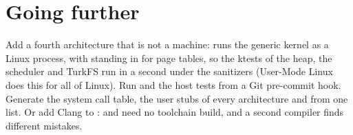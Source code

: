 \documentclass[11pt,a4paper]{article}
\begin{document}
\section{Going further}

Add a fourth architecture that is not a machine:  runs the generic kernel as a Linux process,
with  standing in for page tables, so the ktests of the heap, the scheduler and TurkFS run in a second under
the sanitizers (User-Mode Linux does this for all of Linux). Run  and the host tests from a
Git pre-commit hook. Generate the system call table, the user stubs of every architecture and 
from one list. Or add Clang to :  and
 need no toolchain build, and a second compiler finds different mistakes.

\booklegend
\portlegend
\end{document}
